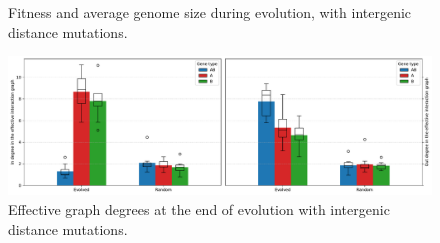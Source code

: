 \begin{figure}
\begin{elasticrow}[width=\textwidth]
\end{elasticrow}
\caption[Average fitness and intergenic size during evolution, with intergenic distance mutations]{Fitness and average genome size during evolution, with intergenic distance mutations.}
\end{figure}



\begin{figure}
\includegraphics[width=\textwidth]{param/evolve-intergene/effective_graph_combined_degree.pdf}
\caption{Effective graph degrees at the end of evolution with intergenic distance mutations.}
\end{figure}

